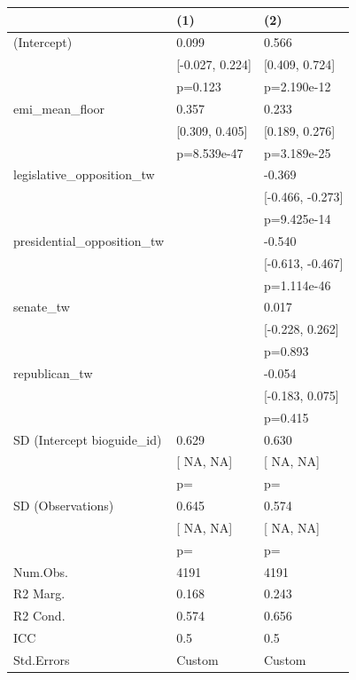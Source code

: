 \begin{tabular}{lll}
\hline
& (1) & (2) \\ \hline
(Intercept) & 0.099 & 0.566 \\
& [-0.027, 0.224] & [0.409, 0.724] \\
& p=0.123 & p=2.190e-12 \\
emi_mean_floor & 0.357 & 0.233 \\
& [0.309, 0.405] & [0.189, 0.276] \\
& p=8.539e-47 & p=3.189e-25 \\
legislative_opposition_tw &  & -0.369 \\
&  & [-0.466, -0.273] \\
&  & p=9.425e-14 \\
presidential_opposition_tw &  & -0.540 \\
&  & [-0.613, -0.467] \\
&  & p=1.114e-46 \\
senate_tw &  & 0.017 \\
&  & [-0.228, 0.262] \\
&  & p=0.893 \\
republican_tw &  & -0.054 \\
&  & [-0.183, 0.075] \\
&  & p=0.415 \\
SD (Intercept bioguide_id) & 0.629 & 0.630 \\
& [  NA,   NA] & [  NA,   NA] \\
& p= & p= \\
SD (Observations) & 0.645 & 0.574 \\
& [  NA,   NA] & [  NA,   NA] \\
& p= & p= \\
Num.Obs. & 4191 & 4191 \\
R2 Marg. & 0.168 & 0.243 \\
R2 Cond. & 0.574 & 0.656 \\
ICC & 0.5 & 0.5 \\
Std.Errors & Custom & Custom \\
\hline
\end{tabular}
